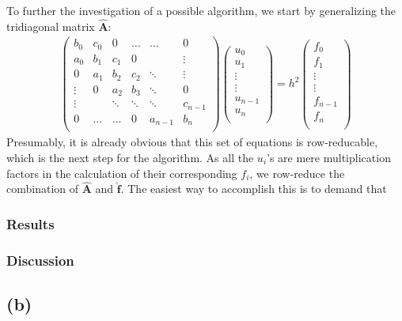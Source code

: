 \documentclass[11pt,a4paper,notitlepage]{article}
\begin{document}
To further the investigation of a possible algorithm, we start by generalizing the tridiagonal matrix $\mathbf{\hat{A}}$:
\begin{align*}
\left(\begin{matrix}
  b_0   & c_0    & 0      & \dots  & \dots  & 0      \\
  a_0   & b_1    & c_1    & 0      &        & \vdots \\
  0     & a_1    & b_2    & c_2    & \ddots & \vdots \\
 \vdots & 0      & a_2    & b_3    & \ddots & 0      \\
 \vdots &        & \ddots & \ddots & \ddots & c_{n-1}\\
  0     & \dots  & \dots  & 0      & a_{n-1}& b_n    \\
\end{matrix}\right) \left(\begin{matrix}
u_0     \\
u_1     \\
\vdots  \\
\vdots  \\
u_{n-1} \\
u_n     \\
\end{matrix}\right) = h^2\left(\begin{matrix}
f_0     \\
f_1     \\
\vdots  \\
\vdots  \\
f_{n-1} \\
f_n     \\
\end{matrix}\right)
\end{align*}
Presumably, it is already obvious that this set of equations is row-reducable, which is the next step for the algorithm. As all the $u_i$'s are mere multiplication factors in the calculation of their corresponding $f_i$, we row-reduce the combination of $\mathbf{\hat{A}}$ and $\mathbf{\hat{f}}$. The easiest way to accomplish this is to demand that  


\subsubsection{Results}
\subsubsection{Discussion}

\subsection{(b)}
\end{document}

